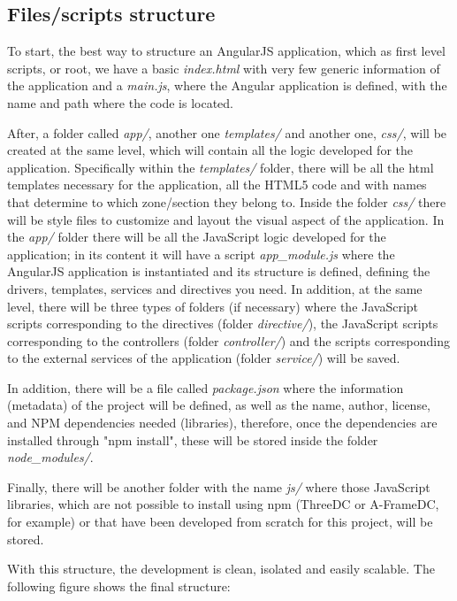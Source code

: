 \documentclass[a4paper, 12pt]{book}
\begin{document}
\subsection{Files/scripts structure}

To start, the best way to structure an AngularJS application, which as first level scripts, or root, we have a basic \textit{index.html} with very few generic information of the application and a \textit{main.js}, where the Angular application is defined, with the name and path where the code is located.

After, a folder called \textit{app/}, another one \textit{templates/} and another one, \textit{css/}, will be created at the same level, which will contain all the logic developed for the application. Specifically within the \textit{templates/} folder, there will be all the html templates necessary for the application, all the HTML5 code and with names that determine to which zone/section they belong to. Inside the folder \textit{css/} there will be style files to customize and layout the visual aspect of the application. In the \textit{app/} folder there will be all the JavaScript logic developed for the application; in its content it will have a script \textit{app\_module.js} where the AngularJS application is instantiated and its structure is defined, defining the drivers, templates, services and directives you need. In addition, at the same level, there will be three types of folders (if necessary) where the JavaScript scripts corresponding to the directives (folder \textit{directive/}), the JavaScript scripts corresponding to the controllers (folder \textit{controller/}) and the scripts corresponding to the external services of the application (folder \textit{service/}) will be saved.

In addition, there will be a file called \textit{package.json} where the information (metadata) of the project will be defined, as well as the name, author, license, and NPM dependencies needed (libraries), therefore, once the dependencies are installed through "npm install", these will be stored inside the folder \textit{node\_modules/}.

Finally, there will be another folder with the name \textit{js/} where those JavaScript libraries, which are not possible to install using npm (ThreeDC or A-FrameDC, for example) or that have been developed from scratch for this project, will be stored.

With this structure, the development is clean, isolated and easily scalable. The following figure shows the final structure:
\end{document}
